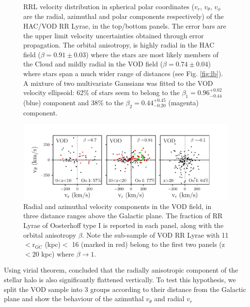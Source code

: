 \documentclass[fleqn,usenatbib]{mnras}
\begin{document}
\begin{figure}
\vspace{-0.4cm}
    \caption{RRL velocity distribution in spherical polar coordinates
      ($v_{r}$, $v_{\theta}$, $v_{\phi}$ are the radial, azimuthal and
      polar components respectively) of the HAC/VOD RR Lyrae, in the top/bottom panels. The error bars are the upper limit velocity uncertainties obtained through error propagation. The orbital anisotropy, is
      highly radial in the HAC field ($\beta = 0.91 \pm 0.03$) where
      the stars are most likely members of the Cloud and mildly radial
      in the VOD field ($\beta = 0.74 \pm 0.04$) where stars span a
      much wider range of distances (see Fig. \ref{fig:lb}). A mixture of two multivariate Gaussians was fitted to the VOD velocity ellipsoid: 62\% of stars seem to belong to the $\beta_{1}= 0.96^{+0.02}_{-0.44}$ (blue) component  and 38\%  to the $\beta_{2}=0.44^{+0.45}_{-0.20}$ (magenta) component. }
    \label{fig:vel}
\end{figure}
%
%
\begin{figure}
\vspace{-0.6cm}
	\hspace{-0.3cm}
	        \includegraphics[scale=0.56]{VOD_velocities_vphi_zcuts.pdf}
\vspace{-0.4cm}
   \caption{Radial and azimuthal velocity components in the VOD field, in
     three distance ranges above the Galactic plane. The fraction of
     RR Lyrae of Oosterhoff type I is reported in each panel, along with the orbital anisotropy $\beta$. Note the sub-sample of VOD RR Lyrae with 11 $<\mathrm{r_{GC}}$ (kpc)$<$ 16 (marked in red) belong to the first two panels (z$<20$ kpc) where $\beta \rightarrow 1$. }
    \label{fig:VOD_vel}
\end{figure}
%
Using virial theorem, \citet{actionhalo} concluded that the radially
anisotropic component of the stellar halo is also significantly
flattened vertically. To test this hypothesis, we split the VOD sample
into 3 groups according to their distance from the Galactic plane and
show the behaviour of the azimuthal $v_{\theta}$ and radial $v_{r}$
\end{document}
